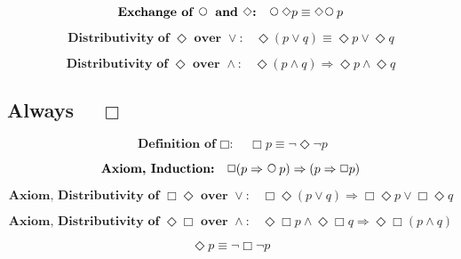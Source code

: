 \documentclass[fleqn, leqno]{article}
\newcommand{\impl}{\ensuremath{\Rightarrow}}        %
\newcommand{\Next}{\;\,\text{\raisebox{3.5pt}{\circle{6}}}}
\newcommand{\Event}{\Diamond}
\newcommand{\Always}{\Box}
\newcommand{\spacer}{\vspace{-30pt}}
\newcommand{\firstspacer}{\vspace{-26pt}}
\begin{document}
\spacer

\begin{equation}\label{E:dNextEvent}
\textbf{Exchange of $\Next$ and $\Event$:}\quad \Next\Event p \equiv \Event\Next p
\end{equation}

\spacer

\begin{equation}\label{E:distEventOr}
\textbf{Distributivity of $\Event$ over $\lor$:}\quad \Event(p \lor q) \equiv \Event p \lor \Event q
\end{equation}

\spacer

\begin{equation}\label{E:distEventAnd}
\textbf{Distributivity of $\Event$ over $\land$:}\quad \Event(p \land q) \impl \Event p \land \Event q
\end{equation}

\subsection*{Always $\quad\Always$}

\begin{equation}\label{E:defAlways}
\textbf{Definition of $\Always$:}\quad \Always p \equiv \neg\Event\neg p
\end{equation}

\firstspacer

\begin{equation}\label{E:induction}
\textbf{Axiom, Induction:}\quad \Always (p \impl \Next p) \impl (p \impl \Always p)
\end{equation}

\spacer

\begin{equation}\label{E:distAlwaysEventOrAx}
\textbf{Axiom, Distributivity of $\Always\Event$ over $\lor$:}\quad \Always\Event(p \lor q) \impl \Always\Event p \lor \Always\Event q
\end{equation}

\spacer

\begin{equation}\label{E:distEventAlwaysAndAx}
\textbf{Axiom, Distributivity of $\Event\Always$ over $\land$:}\quad \Event\Always p \land \Event\Always q \impl \Event\Always(p \land q)
\end{equation}

\spacer

\begin{equation}\label{E:eventAsAlways}
\Event p \equiv \neg\Always\neg p
\end{equation}
\end{document}

